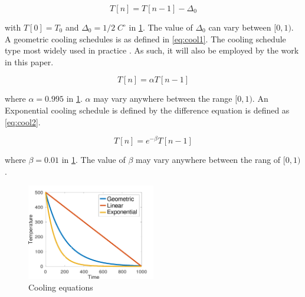 \documentclass[11pt,a4paper,final]{article}
\newcommand{\Tau}{T}                        %
\begin{document}
\begin{equation}
\label{eq:cool0}
\Tau[n] = \Tau[n-1] - \Delta_0
\end{equation}

with \(\Tau[0] = \Tau_0\) and \(\Delta_0 = 1/2\; C^\circ\) in \ref{fig:cool}. The value of \(\Delta_0\) can vary between \([0,1)\). A geometric
cooling schedules is as defined in \ref{eq:cool1}. The cooling schedule type most widely used in practice
\cite{keller-2019-multi-objec}. As such, it will also be employed by the work in this paper.

\begin{equation}
\label{eq:cool1}
\Tau[n] = \alpha \Tau[n-1]
\end{equation}

where \(\alpha = 0.995\) in \ref{fig:cool}. \(\alpha\) may vary anywhere between the range \([0,1)\). An Exponential cooling schedule is
defined by the difference equation is defined as \ref{eq:cool2}.

\begin{equation}
\label{eq:cool2}
\Tau[n] = e^{-\beta}\Tau[n-1]
\end{equation}

where \(\beta = 0.01\) in \ref{fig:cool}. The value of \(\beta\) may vary anywhere between the rang of \([0, 1)\).

\begin{figure}[htbp]
\centering
\includegraphics[width=0.5\textwidth]{sections/img/cool_func.png}
\caption{\label{fig:cool}Cooling equations}
\end{figure}
\end{document}
